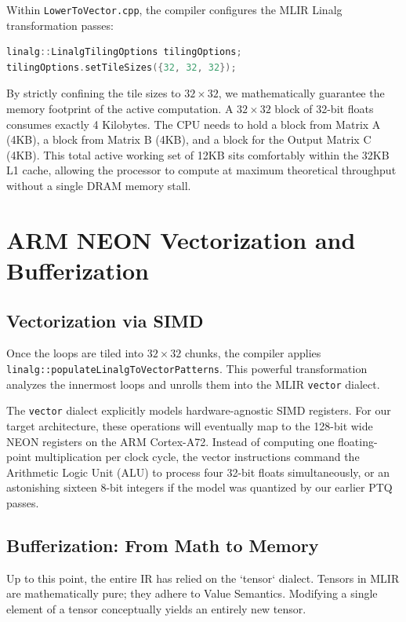 Within \texttt{LowerToVector.cpp}, the compiler configures the MLIR Linalg transformation passes:

\begin{lstlisting}[language=C++]
linalg::LinalgTilingOptions tilingOptions;
tilingOptions.setTileSizes({32, 32, 32});
\end{lstlisting}

By strictly confining the tile sizes to $32 \times 32$, we mathematically guarantee the memory footprint of the active computation. A $32 \times 32$ block of 32-bit floats consumes exactly 4 Kilobytes. The CPU needs to hold a block from Matrix A (4KB), a block from Matrix B (4KB), and a block for the Output Matrix C (4KB). This total active working set of 12KB sits comfortably within the 32KB L1 cache, allowing the processor to compute at maximum theoretical throughput without a single DRAM memory stall.

\section{ARM NEON Vectorization and Bufferization}

\subsection{Vectorization via SIMD}
Once the loops are tiled into $32 \times 32$ chunks, the compiler applies \texttt{linalg::populateLinalgToVectorPatterns}. This powerful transformation analyzes the innermost loops and unrolls them into the MLIR \texttt{vector} dialect. 

The \texttt{vector} dialect explicitly models hardware-agnostic SIMD registers. For our target architecture, these operations will eventually map to the 128-bit wide NEON registers on the ARM Cortex-A72. Instead of computing one floating-point multiplication per clock cycle, the vector instructions command the Arithmetic Logic Unit (ALU) to process four 32-bit floats simultaneously, or an astonishing sixteen 8-bit integers if the model was quantized by our earlier PTQ passes.

\subsection{Bufferization: From Math to Memory}
Up to this point, the entire IR has relied on the `tensor` dialect. Tensors in MLIR are mathematically pure; they adhere to Value Semantics. Modifying a single element of a tensor conceptually yields an entirely new tensor. 

